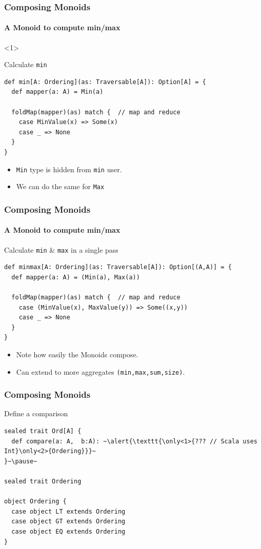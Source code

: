 \documentclass{beamer}
\begin{document}
\begin{frame}[fragile]
  \frametitle{Composing Monoids}
  \framesubtitle{A Monoid to compute min/max}

  \begin{onlyenv}<1>
  \begin{block}{Calculate \texttt{min}}
  \begin{lstlisting}
def min[A: Ordering](as: Traversable[A]): Option[A] = {
  def mapper(a: A) = Min(a)

  foldMap(mapper)(as) match {  // map and reduce
    case MinValue(x) => Some(x)
    case _ => None
  }
}
  \end{lstlisting}
  \end{block}
  \end{onlyenv}

  \begin{itemize}
    \item \texttt{Min} type is hidden from \texttt{min} user.
    \item We can do the same for \texttt{Max}
  \end{itemize}
\end{frame}


\begin{frame}[fragile]
  \frametitle{Composing Monoids}
  \framesubtitle{A Monoid to compute min/max}
  \begin{block}{Calculate \texttt{min} \& \texttt{max} in a \alert{single pass}}
  \begin{lstlisting}
def minmax[A: Ordering](as: Traversable[A]): Option[(A,A)] = {
  def mapper(a: A) = (Min(a), Max(a))

  foldMap(mapper)(as) match {  // map and reduce
    case (MinValue(x), MaxValue(y)) => Some((x,y))
    case _ => None
  }
}
  \end{lstlisting}
  \end{block}

  \begin{itemize}
    \item Note how easily the Monoids \alert{compose}.
    \item Can extend to more \alert{aggregates} \texttt{(min,max,sum,size)}.
  \end{itemize}
\end{frame}

\iffalse
\begin{frame}[fragile]
  \frametitle{Composing Monoids}
  \begin{block}{Define a comparison}
  \begin{lstlisting}
sealed trait Ord[A] {
  def compare(a: A,  b:A): ~\alert{\texttt{\only<1>{??? // Scala uses Int}\only<2>{Ordering}}}~
}~\pause~

sealed trait Ordering

object Ordering {
  case object LT extends Ordering
  case object GT extends Ordering
  case object EQ extends Ordering
}
  \end{lstlisting}
  \end{block}
\end{frame}
\end{document}
